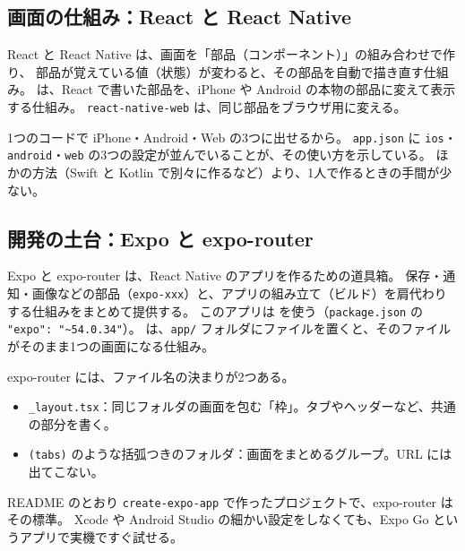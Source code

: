 \subsection{画面の仕組み：React と React Native}

\begin{kkbadgepoint}[定義]{React と React Native}
   は、画面を「部品（コンポーネント）」の組み合わせで作り、
  部品が覚えている値（状態）が変わると、その部品を自動で描き直す仕組み。
   は、React で書いた部品を、iPhone や Android の本物の部品に変えて表示する仕組み。
  \texttt{react-native-web} は、同じ部品をブラウザ用に変える。
\end{kkbadgepoint}

1つのコードで iPhone・Android・Web の3つに出せるから。
\texttt{app.json} に \texttt{ios}・\texttt{android}・\texttt{web} の3つの設定が並んでいることが、その使い方を示している。\evCode
ほかの方法（Swift と Kotlin で別々に作るなど）より、1人で作るときの手間が少ない。\evGuess

\subsection{開発の土台：Expo と expo-router}

\begin{kkbadgepoint}[定義]{Expo と expo-router}
   は、React Native のアプリを作るための道具箱。
  保存・通知・画像などの部品（\texttt{expo-xxx}）と、アプリの組み立て（ビルド）を肩代わりする仕組みをまとめて提供する。
  このアプリは  を使う（\texttt{package.json} の \texttt{"expo": "\textasciitilde 54.0.34"}）。
   は、\texttt{app/} フォルダにファイルを置くと、そのファイルがそのまま1つの画面になる仕組み。
\end{kkbadgepoint}

expo-router には、ファイル名の決まりが2つある。
\begin{itemize}
  \item \texttt{\_layout.tsx}：同じフォルダの画面を包む「枠」。タブやヘッダーなど、共通の部分を書く。
  \item \texttt{(tabs)} のような括弧つきのフォルダ：画面をまとめるグループ。URL には出てこない。
\end{itemize}

README のとおり \texttt{create-expo-app} で作ったプロジェクトで、expo-router はその標準。\evCode
Xcode や Android Studio の細かい設定をしなくても、Expo Go というアプリで実機ですぐ試せる。\evGuess

